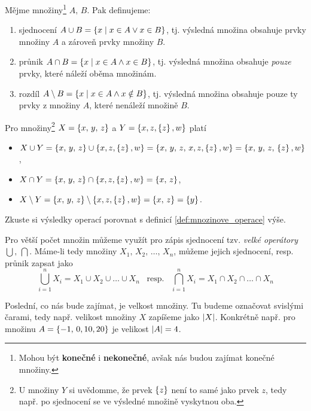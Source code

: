\begin{definition}\label{def:mnozinove_operace}
    Mějme množiny\footnote{Mohou být \textbf{konečné} i \textbf{nekonečné}, avšak nás budou zajímat konečné množiny.} $A,\,B$. Pak definujeme:
    \begin{enumerate}[label=(\roman*)]
        \item sjednocení $A \cup B = \left\{x \;\middle\vert\; x\in A \lor x\in B\right\}$, tj. výsledná množina obsahuje prvky množiny $A$ a zároveň prvky množiny $B$.
        \item průnik $A \cap B = \left\{x \;\middle\vert\; x\in A \land x\in B\right\}$, tj. výsledná množina obsahuje \emph{pouze} prvky, které náleží oběma množinám.
        \item rozdíl $A \setminus B = \left\{x \;\middle\vert\; x\in A \land x \notin B\right\}$, tj. výsledná množina obsahuje pouze ty prvky z množiny $A$, které nenáleží množině $B$.
    \end{enumerate}
\end{definition}

\begin{example}
    Pro množiny\footnote{U množiny $Y$ si uvědomme, že prvek $\left\{z\right\}$ není to samé jako prvek $z$, tedy např. po sjednocení se ve výsledné množině vyskytnou oba.} $X=\left\{x,\,y,\,z\right\}$ a $Y=\left\{x,z,\left\{z\right\},w\right\}$ platí
    \begin{itemize}
        \item $X \cup Y = \left\{x,\,y,\,z\right\} \cup \left\{x,z,\left\{z\right\},w\right\}=\left\{x,\,y,\,z,\,x,z,\left\{z\right\},w\right\}=\left\{x,\,y,\,z,\,\left\{z\right\},w\right\}$,
        \item $X \cap Y = \left\{x,\,y,\,z\right\} \cap \left\{x,z,\left\{z\right\},w\right\}=\left\{x,\,z\right\}$,
        \item $X \setminus Y = \left\{x,\,y,\,z\right\} \setminus \left\{x,z,\left\{z\right\},w\right\}=\left\{x,\,z\right\}=\left\{y\right\}$.
    \end{itemize}
    Zkuste si výsledky operací porovnat s definicí \ref{def:mnozinove_operace} výše.
\end{example}

Pro větší počet množin můžeme využít pro zápis sjednocení tzv. \emph{velké operátory} $\bigcup,\,\bigcap$. Máme-li tedy množiny $X_1,\,X_2,\,\dots,\,X_n$, můžeme jejich sjednocení, resp. průnik zapsat jako
\begin{equation*}
    \bigcup\limits_{i=1}^{n}X_i = X_1 \cup X_2 \cup \dots \cup X_n\;\;\;\text{resp.}\;\;\;\bigcap\limits_{i=1}^{n}X_i = X_1 \cap X_2 \cap \dots \cap X_n
\end{equation*}

Poslední, co nás bude zajímat, je velkost množiny. Tu budeme označovat svislými čarami, tedy např. velikost množiny $X$ zapíšeme jako $\left| X \right|$. Konkrétně např. pro množinu $A=\left\{-1,\,0,10,20\right\}$ je velikost $\left| A \right|=4$.